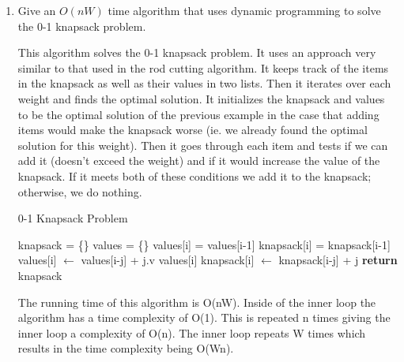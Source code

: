 \documentclass{article}
\begin{document}
\begin{enumerate}
\item Give an $O(nW)$ time algorithm that uses dynamic programming to solve
the 0-1 knapsack problem.

This algorithm solves the 0-1 knapsack problem. It uses an approach very similar to that used in the rod cutting algorithm.
It keeps track of the items in the knapsack as well as their values in two lists.
Then it iterates over each weight and finds the optimal solution. It initializes the knapsack and values to be the optimal solution of the previous example in the case that adding items would make the knapsack worse (ie.
we already found the optimal solution for this weight). Then it goes through each item and tests if we can add it (doesn't exceed the weight) and if it would increase the value of the knapsack.
If it meets both of these conditions we add it to the knapsack; otherwise, we do nothing.

\begin{algorithm}
\caption{0-1 Knapsack Problem}\label{knap}
\begin{algorithmic}[1]
\State knapsack = \{\}
\State values = \{\}
\State values[i] = values[i-1]
\State knapsack[i] = knapsack[i-1]
\State values[i] $\gets$ values[i-j] + j.v values[i]
\State knapsack[i] $\gets$ knapsack[i-j] + j
\EndIf
\EndFor
\EndFor
\State \textbf{return} knapsack
\EndFunction
\end{algorithmic}
\end{algorithm}

The running time of this algorithm is O(nW). Inside of the inner loop the algorithm has a time complexity of O(1).
This is repeated n times giving the inner loop a complexity of O(n). The inner loop repeats W times which results in the time complexity being O(Wn).


\end{enumerate}
\end{document}
